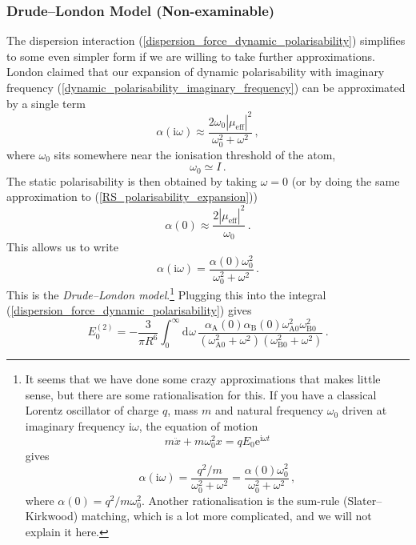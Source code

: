 \documentclass{article}
\theoremstyle{plain}\theoremheaderfont{\normalfont\itshape}\theorembodyfont{\rmfamily}\theoremseparator{.}\newtheorem*{rem}{Remark}\newtheorem*{ex}{Example}\newtheorem*{proof}{Proof}\newtheorem*{altp}{Alternative proof}
\theoremstyle{plain}\theoremheaderfont{\normalfont\bfseries}\theorembodyfont{\rmfamily}\theoremseparator{.}\newtheorem{thm}{Theorem}[section]\newtheorem{lem}[thm]{Lemma}\newtheorem{prop}[thm]{Proposition}\newtheorem*{cor}{Corollary}\newtheorem{defn}[thm]{Definition}\newtheorem{clm}[thm]{Claim}\newtheorem{clminproof}{Claim}
\theoremstyle{break}\theoremheaderfont{\normalfont\itshape}\theorembodyfont{\rmfamily}\theoremseparator{.\medskip}\newtheorem*{proofskip}{Proof}\newtheorem*{exs}{Examples}\newtheorem*{rems}{Remarks}
\theoremstyle{break}\theoremheaderfont{\normalfont\bfseries}\theorembodyfont{\rmfamily}\theoremseparator{.\medskip}\newtheorem{lemskip}[thm]{Lemma}\newtheorem{defnskip}[thm]{Definition}\newtheorem{propskip}[thm]{Proposition}\newtheorem{thmskip}[thm]{Theorem}
\numberwithin{equation}{section}
\newcommand{\ii}{\mathrm{i}}
\newcommand{\ee}{\mathrm{e}}
\newcommand{\dd}[2][]{\mathrm{d}^{#1} #2\,}
\newcommand{\abs}[1]{\left| #1 \right|}
\renewcommand{\AA}{\mathrm{A}}
\newcommand{\BB}{\mathrm{B}}
\begin{document}
    \subsubsection{Drude--London Model (Non-examinable)}
    The dispersion interaction (\ref{dispersion_force_dynamic_polarisability}) simplifies to some even simpler form if we are willing to take further approximations. London claimed that our expansion of dynamic polarisability with imaginary frequency (\ref{dynamic_polarisability_imaginary_frequency}) can be approximated by a single term
    \begin{equation}
        \alpha(\ii\omega)\approx\frac{2\omega_0\abs{\mu_{\text{eff}}}^2}{\omega_0^2+\omega^2}\,,
    \end{equation}
    where \(\omega_0\) sits somewhere near the ionisation threshold of the atom,
    \begin{equation}
        \omega_0\simeq I\,.
    \end{equation}
    The static polarisability is then obtained by taking \(\omega=0\) (or by doing the same approximation to (\ref{RS_polarisability_expansion}))
    \begin{equation}
        \alpha(0)\approx\frac{2\abs{\mu_{\text{eff}}}^2}{\omega_0}\,.
    \end{equation}
    This allows us to write
    \begin{equation}
        \alpha(\ii\omega)=\frac{\alpha(0)\omega_0^2}{\omega_0^2+\omega^2}\,.
    \end{equation}
    This is the \textit{Drude--London model}.\footnote{It seems that we have done some crazy approximations that makes little sense, but there are some rationalisation for this. If you have a classical Lorentz oscillator of charge \(q\), mass \(m\) and natural frequency \(\omega_0\) driven at imaginary frequency \(\ii\omega\), the equation of motion
    \begin{equation}
        m\ddot{x}+m\omega_0^2 x=qE_0\ee^{\ii\omega t}
    \end{equation}
    gives
    \begin{equation}
        \alpha(\ii\omega)=\frac{q^2/m}{\omega_0^2+\omega^2}=\frac{\alpha(0)\omega_0^2}{\omega_0^2+\omega^2}\,,
    \end{equation}
    where \(\alpha(0)=q^2/m\omega_0^2\). Another rationalisation is the sum-rule (Slater--Kirkwood) matching, which is a lot more complicated, and we will not explain it here.} Plugging this into the integral (\ref{dispersion_force_dynamic_polarisability}) gives
    \begin{equation}
        E_0^{(2)}=-\frac{3}{\pi R^6}\int_{0}^{\infty}\dd{\omega}\frac{\alpha_{\AA}(0)\alpha_{\BB}(0)\omega_{\AA 0}^2\omega_{\BB 0}^2}{(\omega_{\AA 0}^2 +\omega^2)(\omega_{\BB 0}^2 +\omega^2)}\,.
    \end{equation}
\end{document}
